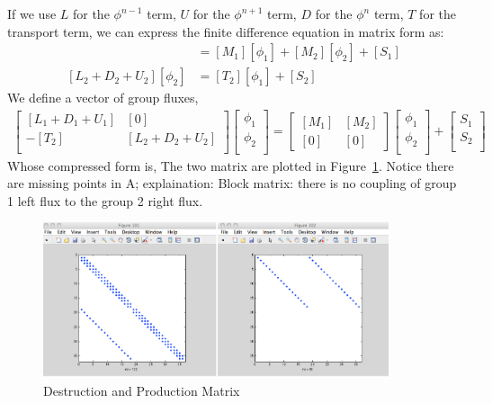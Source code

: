 \documentclass{school-22.211-notes}
\begin{document}
If we use $L$ for the $\phi^{n-1}$ term, $U$ for the $\phi^{n+1}$ term, $D$ for the $\phi^n$ term, $T$ for the transport term, we can express the finite difference equation in matrix form as: 
\begin{align}
[L_1 + D_1 + U_1] [\phi_1] &= [M_1] [\phi_1] + [M_2][\phi_2] + [S_1] \\
[L_2 + D_2 + U_2] [\phi_2] &= [T_2] [\phi_1] + [S_2] 
\end{align}
We define a vector of group fluxes, 
\begin{align}
\left[ \begin{array}{cc} 
[L_1 + D_1 + U_1] & [0] \\
-[T_2] & [L_2 + D_2 + U_2] \\
\end{array} \right] 
\left[ \begin{array}{c}
\phi_1 \\ \phi_2 \\ \end{array} \right] 
= \left[ {\begin{array}{cc} \left[M_1\right] & \left[M_2\right] \\ \left[0\right] & \left[0\right] \end{array}} \right] 
\left[ \begin{array}{c}
\phi_1 \\ \phi_2 \\ \end{array} \right] 
+ 
\left[ \begin{array}{c} 
S_1 \\ S_2 \\ \end{array} \right] 
\end{align}
Whose compressed form is, 
\eqn{ [A] [\phi] = [M] [\phi] + [S] }
The two matrix are plotted in Figure~\ref{matrix-form}. Notice there are missing points in A; explaination: Block matrix: there is no coupling of group 1 left flux to the group 2 right flux. 
\begin{figure}
  \centering
  \includegraphics[width=4in]{images/dfs/matrix-form.png}
  \caption{Destruction and Production Matrix} \label{matrix-form}
\end{figure}
\end{document}
